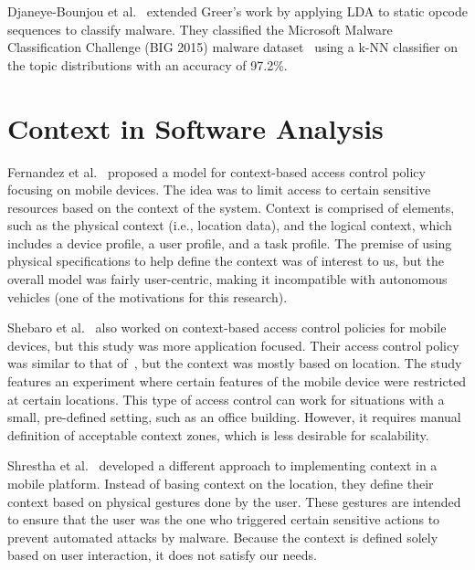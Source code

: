 \documentclass[../stegner_thesis.tex]{subfiles}
\begin{document}
\par Djaneye-Bounjou et al.~\cite{djaneye-boundjouStaticAnalysis2019a} extended
Greer's work by applying LDA to static opcode sequences to classify malware.
They classified the Microsoft Malware Classification Challenge (BIG 2015)
malware dataset~\cite{ronenMicrosoftMalware2018} using a k-NN classifier on the
topic distributions with an accuracy of 97.2\%.

\section{Context in Software Analysis}%
\label{sec:bg_context}

\par Fernandez et al.~\cite{fernandezContextsContextbased2007} proposed a model
for context-based access control policy focusing on mobile devices.
The idea was to limit access to certain sensitive resources based on the
context of the system.
Context is comprised of elements, such as the physical context (i.e., location
data), and the logical context, which includes a device profile, a user
profile, and a task profile.
The premise of using physical specifications to help define the context was of
interest to us, but the overall model was fairly user-centric, making it
incompatible with autonomous vehicles (one of the motivations for this
research).

\par Shebaro et al.~\cite{shebaroContextbasedAccess2015} also worked on
context-based access control policies for mobile devices, but this study was
more application focused.
Their access control policy was similar to that
of~\cite{fernandezContextsContextbased2007}, but the context was mostly based
on location.
The study features an experiment where certain features of the mobile device
were restricted at certain locations.
This type of access control can work for situations with a small, pre-defined
setting, such as an office building.
However, it requires manual definition of acceptable context zones, which is
less desirable for scalability.

\par Shrestha et al.~\cite{shresthaTapwaverubLightweight2015} developed a
different approach to implementing context in a mobile platform.
Instead of basing context on the location, they define their context based on
physical gestures done by the user.
These gestures are intended to ensure that the user was the one who triggered
certain sensitive actions to prevent automated attacks by malware.
Because the context is defined solely based on user interaction, it does not
satisfy our needs.
\end{document}
